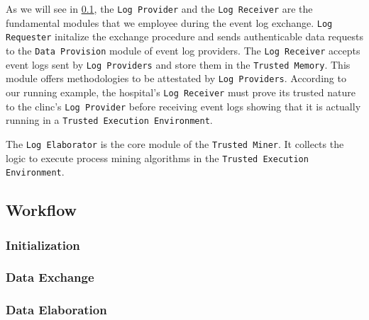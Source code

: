 As we will see in \cref{sec:architecture:workflow}, the \texttt{Log Provider} and the \texttt{Log Receiver} are the fundamental modules that we employee during the event log exchange. \texttt{Log Requester} initalize the exchange procedure and sends authenticable data requests to the \texttt{Data Provision} module of event log providers. The \texttt{Log Receiver} accepts event logs sent by \texttt{Log Providers} and store them in the \texttt{Trusted Memory}. This module offers methodologies to be attestated by \texttt{Log Providers}. According to our running example, the hospital's \texttt{Log Receiver} must prove its trusted nature to the clinc's \texttt{Log Provider} before receiving event logs showing that it is actually running in a \texttt{Trusted Execution Environment}.

The \texttt{Log Elaborator} is the core module of the \texttt{Trusted Miner}. It collects the logic to execute process mining algorithms in the \texttt{Trusted Execution Environment}.




































\subsection{Workflow}
\label{sec:architecture:workflow}
\subsubsection{Initialization}
\subsubsection{Data Exchange}
\subsubsection{Data Elaboration}




